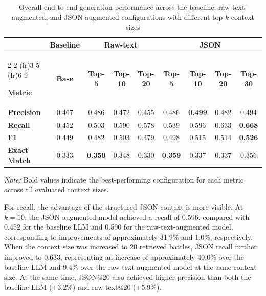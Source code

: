 \begin{table}[H]
    \centering
    \caption{Overall end-to-end generation performance across the baseline, raw-text-augmented, and JSON-augmented configurations with different top-$k$ context sizes}
    \label{tab:e2e_overall_performance}

    \scriptsize
    \renewcommand{\arraystretch}{1.5}
    \setlength{\tabcolsep}{3pt}

    \begin{tabular}{l c ccc cccc}
        \toprule
        & \multicolumn{1}{c}{\textbf{Baseline}}
        & \multicolumn{3}{c}{\textbf{Raw-text}}
        & \multicolumn{4}{c}{\textbf{JSON}} \\
        \cmidrule(lr){2-2}
        \cmidrule(lr){3-5}
        \cmidrule(lr){6-9}

        \textbf{Metric} &
        \textbf{Base} &
        \textbf{Top-5} &
        \textbf{Top-10} &
        \textbf{Top-20} &
        \textbf{Top-5} &
        \textbf{Top-10} &
        \textbf{Top-20} &
        \textbf{Top-30} \\
        \midrule

        \textbf{Precision} &
        0.467 &
        0.486 & 0.472 & 0.455 &
        0.486 & \textbf{0.499} & 0.482 & 0.494 \\

        \textbf{Recall} &
        0.452 &
        0.503 & 0.590 & 0.578 &
        0.539 & 0.596 & 0.633 & \textbf{0.668} \\

        \textbf{F1} &
        0.449 &
        0.482 & 0.503 & 0.479 &
        0.498 & 0.515 & 0.514 & \textbf{0.526} \\

        \textbf{Exact Match} &
        0.333 &
        \textbf{0.359} & 0.348 & 0.330 &
        \textbf{0.359} & 0.337 & 0.337 & 0.356 \\

        \bottomrule
    \end{tabular}

    \par\vspace{4pt}
    \begin{minipage}{\linewidth}
        \footnotesize
        \textit{Note:} Bold values indicate the best-performing
        configuration for each metric across all evaluated
        context sizes.
    \end{minipage}

\end{table}
For recall, the advantage of the structured JSON context is more visible. At \(k=10\), the JSON-augmented model achieved a recall of 0.596, compared with 0.452 for the baseline LLM and 0.590 for the raw-text-augmented model, corresponding to improvements of approximately 31.9\% and 1.0\%, respectively. When the context size was increased to 20 retrieved battles, JSON recall further improved to 0.633, representing an increase of approximately 40.0\% over the baseline LLM and 9.4\% over the raw-text-augmented model at the same context size. At the same time, JSON@20 also achieved higher precision than both the baseline LLM (+3.2\%) and raw-text@20 (+5.9\%).

